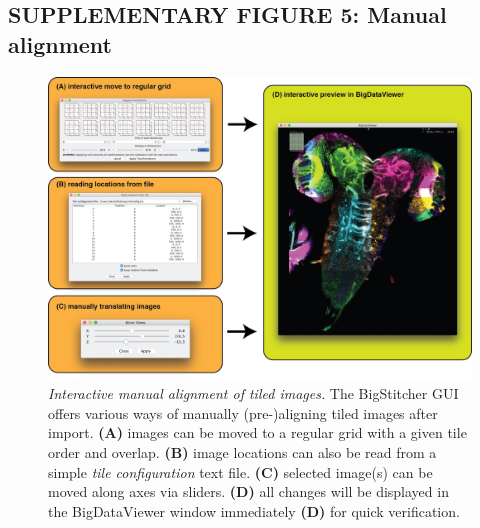 \documentclass[]{spie}  %
\begin{document}
\pagebreak


\subsection*{SUPPLEMENTARY FIGURE 5: Manual alignment}
\vspace{1mm}
\begin{figure}[h!]
\includegraphics[width=\textwidth]{manual-view-arrangement.jpg}
\vspace{-2.0mm}
\caption{\hspace{-0.5mm} \emph{Interactive manual alignment of tiled images.} The BigStitcher GUI offers various ways of manually (pre-)aligning tiled images after import. \textbf{(A)} images can be moved to a regular grid with a given tile order and overlap. \textbf{(B)} image locations can also be read from a simple \emph{tile configuration} text file. \textbf{(C)} selected image(s) can be moved along axes via sliders. \textbf{(D)} all changes will be displayed in the BigDataViewer window immediately \textbf{(D)} for quick verification. 
}
\label{fig:sup-fig-manual-align1}
\end{figure}

\pagebreak
\end{document}
